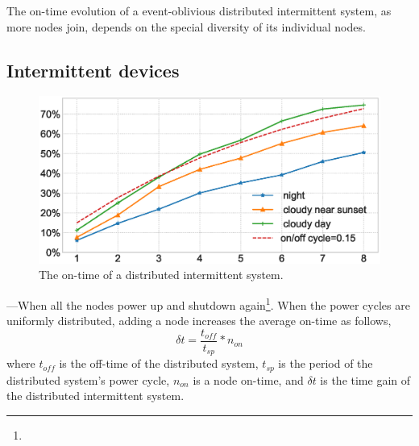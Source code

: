 
The on-time evolution of a event-oblivious distributed intermittent system, as more nodes join, depends on the special diversity of its individual nodes.
\subsection{Intermittent devices}
%
\begin{figure}
	\centering
		\includegraphics[width=\columnwidth]{figures/sysAvailability}
	\caption{The on-time of a distributed intermittent system.}
	\label{fig:independentCoverage}
\end{figure}
%
---When all the nodes power up and shutdown again\footnote{}. 
When the power cycles are uniformly distributed, adding a node increases the average on-time as follows, 
%
\begin{equation}
\delta t = \frac{t_{off}}{t_{sp}} * n_{on}
		\label{eq:indCov}
\end{equation}
%
where $t_{off}$ is the off-time of the distributed system, $t_{sp}$ is the period of the distributed system's power cycle, $n_{on}$ is a node on-time, and $\delta t$ is the time gain of the distributed intermittent system.

